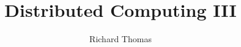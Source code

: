 \documentclass{csse4400}
\title{Distributed Computing III}
\author{Richard Thomas}
\date{\week{9}}
\begin{document}
\makecover





\end{document}
